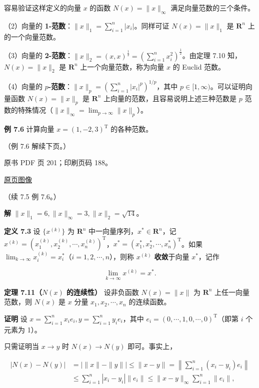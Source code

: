 容易验证这样定义的向量 \(x\) 的函数 \(N(x)=\|x\|_\infty\) 满足向量范数的三个条件。

（2）向量的 \textbf{1-范数}：\(\|x\|_1=\sum_{i=1}^{n}|x_i|\)。同样可证 \(N(x)=\|x\|_1\) 是 \(\mathbf R^n\) 上的一个向量范数。

（3）向量的 \textbf{2-范数}：\(\|x\|_2=(x,x)^{\frac12}=\left(\sum_{i=1}^{n}x_i^2\right)^{\frac12}\)。由定理 7.10 知，\(N(x)=\|x\|_2\) 是 \(\mathbf R^n\) 上一个向量范数，称为向量 \(x\) 的 Euclid 范数。

（4）向量的 \textbf{\(p\)-范数}：\(\|x\|_p=\left(\sum_{i=1}^{n}|x_i|^p\right)^{1/p}\)，其中 \(p\in[1,\infty)\)。可以证明向量函数 \(N(x)=\|x\|_p\) 是 \(\mathbf R^n\) 上向量的范数，且容易说明上述三种范数是 \(p\) 范数的特殊情况（\(\|x\|_\infty=\lim_{p\to\infty}\|x\|_p\)）。

\textbf{例 7.6} 计算向量 \(x=(1,-2,3)^{\mathrm T}\) 的各种范数。

（例 7.6 解续下页。）

\clearpage

原书 PDF 页 201；印刷页码 188。

\href{source-images/pdf-201.jpeg}{原页图像}

（续 7.5 例 7.6。）

\textbf{解} \(\|x\|_1=6,\|x\|_\infty=3,\|x\|_2=\sqrt{14}\)。

\textbf{定义 7.3} 设 \(\{x^{(k)}\}\) 为 \(\mathbf R^n\) 中一向量序列，\(x^*\in\mathbf R^n\)，记 \(x^{(k)}=(x_1^{(k)},x_2^{(k)},\cdots,x_n^{(k)})^{\mathrm T}\)，\(x^*=(x_1^*,x_2^*,\cdots,x_n^*)^{\mathrm T}\)。如果 \(\lim_{k\to\infty}x_i^{(k)}=x_i^*\)（\(i=1,2,\cdots,n\)），则称 \(x^{(k)}\) \textbf{收敛}于向量 \(x^*\)，记作

\[
\lim_{k\to\infty}x^{(k)}=x^*.
\]

\textbf{定理 7.11（\(N(x)\) 的连续性）} 设非负函数 \(N(x)=\|x\|\) 为 \(\mathbf R^n\) 上任一向量范数，则 \(N(x)\) 是 \(x\) 分量 \(x_1,x_2,\cdots,x_n\) 的连续函数。

\textbf{证明} 设 \(x=\sum_{i=1}^{n}x_ie_i,y=\sum_{i=1}^{n}y_ie_i\)，其中 \(e_i=(0,\cdots,1,0,\cdots,0)^{\mathrm T}\)（即第 \(i\) 个元素为 1）。

只需证明当 \(x\to y\) 时 \(N(x)\to N(y)\) 即可。事实上，

\[
\begin{aligned}
|N(x)-N(y)|
&=\big|\|x\|-\|y\|\big|\leqslant\|x-y\|
=\left\|\sum_{i=1}^{n}(x_i-y_i)e_i\right\|\\
&\leqslant\sum_{i=1}^{n}|x_i-y_i|\|e_i\|
\leqslant\|x-y\|_\infty\sum_{i=1}^{n}\|e_i\|,
\end{aligned}
\]

